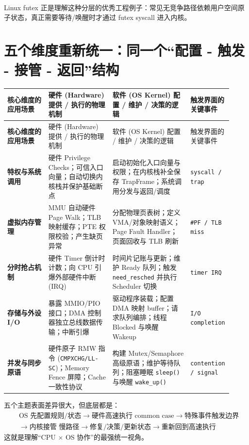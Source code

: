 \documentclass[11pt,a4paper]{ctexart}
\newcommand{\code}[1]{\texttt{#1}}
\begin{document}
Linux futex 正是理解这种分层的优秀工程例子：常见无竞争路径依赖用户空间原子状态，真正需要等待/唤醒时才通过 futex syscall 进入内核。

\section{五个维度重新统一：同一个“配置 - 触发 - 接管 - 返回”结构}

\begingroup
\small
\renewcommand{\arraystretch}{1.25}
\begin{longtable}{>{\bfseries}p{0.18\linewidth} p{0.28\linewidth} p{0.34\linewidth} p{0.12\linewidth}}
\toprule
核心维度的应用场景 & 硬件 (Hardware) 提供 / 执行的物理机制 & 软件 (OS Kernel) 配置 / 维护 / 决策的逻辑 & 触发界面的关键事件\\
\midrule
\endfirsthead
\toprule
核心维度的应用场景 & 硬件 (Hardware) 提供 / 执行的物理机制 & 软件 (OS Kernel) 配置 / 维护 / 决策的逻辑 & 触发界面的关键事件\\
\midrule
\endhead
特权与系统调用 & 硬件 Privilege Checks；可信入口向量；自动切换内核栈并保护基础断点 & 启动初始化入口向量与权限；在内核栈补全保存 TrapFrame；系统调用分发与返回/调度 & \code{syscall / trap}\\
虚拟内存管理 & MMU 自动硬件 Page Walk；TLB 映射缓存；PTE 权限校验；产生缺页异常 & 分配物理页表树；定义 VMA/对象映射语义；Page Fault Handler；页面回收与 TLB 刷新 & \code{\#PF / TLB miss}\\
分时抢占机制 & 硬件 Timer 倒计时计数；向 CPU 引爆外部硬件中断 (IRQ) & 时间片记账与更新；维护 Ready 队列；触发 \code{need\_resched} 并执行 Scheduler 切换 & \code{timer IRQ}\\
存储与外设 I/O & 暴露 MMIO/PIO 接口；DMA 控制器独立总线数据传输；中断引爆 & 驱动程序装载；配置 DMA 映射 buffer；请求队列编排；线程 Blocked 与唤醒 Wakeup & \code{I/O completion}\\
并发与同步原语 & 硬件原子 RMW 指令 (\code{CMPXCHG/LL-SC})；Memory Fence 屏障；Cache 一致性协议 & 构建 Mutex/Semaphore 高级原语；维护等待队列；阻塞睡眠 \code{sleep()} 与唤醒 \code{wake\_up()} & \code{contention / signal}\\
\bottomrule
\end{longtable}
\endgroup

\begin{corebox}[真正统一的结构]
五个主题表面差异很大，但底层都是：
\[
\boxed{
\begin{aligned}
&\text{OS 先配置规则/状态}\rightarrow\text{硬件高速执行 common case}\rightarrow\text{特殊事件触发边界}\\
&\rightarrow\text{内核接管 慢路径}\rightarrow\text{修复/决策/更新状态}\rightarrow\text{重新回到高速执行}
\end{aligned}
}
\]
这就是理解“CPU × OS 协作”的最强统一视角。
\end{corebox}
\end{document}
